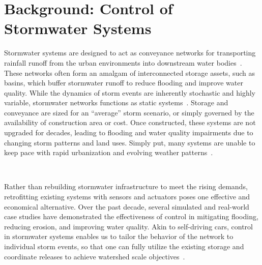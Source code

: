 \section{Background: Control of Stormwater Systems}\label{sec:ctrlstrmsystems}

Stormwater systems are designed to act as conveyance networks for transporting rainfall runoff from the urban environments into downstream water bodies~\cite{national2009urban, Rossman2015a}.
These networks often form an amalgam of interconnected storage assets, such as basins, which buffer stormwater runoff to reduce flooding and improve water quality.
While the dynamics of storm events are inherently stochastic and highly variable, stormwater networks functions as static systems~\cite{kerkez2016}.
Storage and conveyance are sized for an ``average'' storm scenario, or simply governed by the availability of construction area or cost.
Once constructed, these systems are not upgraded for decades, leading to flooding and water quality impairments due to changing storm patterns and land uses. 
Simply put, many systems are unable to keep pace with rapid urbanization and evolving weather patterns~\cite{kerkez2016}.


\

Rather than rebuilding stormwater infrastructure to meet the rising demands, retrofitting existing systems with sensors and actuators poses one effective and economical alternative\cite{kerkez2016}.
Over the past decade, several simulated\cite{Mullapudi_Lewis_Gruden_Kerkez_2020, Troutman_2020, lund2018, Wong_Kerkez_2018,Ocampo-Martinez_2015,vezzaro2014} and real-world case studies\cite{Mullapudi_Bartos_Wong_Kerkez_2018} have demonstrated the effectiveness of control in mitigating flooding, reducing erosion, and improving water quality.
Akin to self-driving cars, control in stormwater systems enables us to tailor the behavior of the network to individual storm events, so that one can fully utilize the existing storage and coordinate releases to achieve watershed scale objectives~\cite{kerkez2016}.

